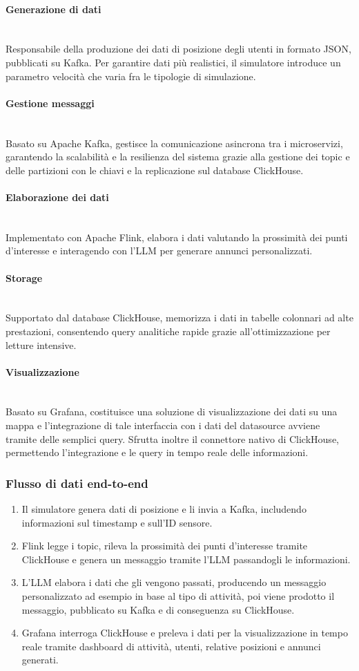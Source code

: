 \documentclass[10pt]{article}
\newcommand{\myparagraph}[1]{\paragraph{#1}\mbox{}\\}
\begin{document}
\myparagraph{Generazione di dati}
Responsabile della produzione dei dati di posizione degli utenti in formato JSON, pubblicati su Kafka.
Per garantire dati più realistici, il simulatore introduce un parametro velocità che varia fra le tipologie di simulazione.

\myparagraph{Gestione messaggi}
Basato su Apache Kafka, gestisce la comunicazione asincrona tra i microservizi, garantendo la scalabilità e la resilienza del sistema grazie alla gestione dei topic e delle partizioni con le chiavi e la replicazione sul database ClickHouse.

\myparagraph{Elaborazione dei dati}
Implementato con Apache Flink, elabora i dati valutando la prossimità dei punti d’interesse e interagendo con
l’LLM per generare annunci personalizzati.

\myparagraph{Storage}
Supportato dal database ClickHouse, memorizza i dati in tabelle colonnari ad alte prestazioni, consentendo query
analitiche rapide grazie all’ottimizzazione per letture intensive.

\myparagraph{Visualizzazione}
Basato su Grafana, costituisce una soluzione di visualizzazione dei dati su una mappa e l'integrazione di tale interfaccia con i dati del datasource avviene tramite delle semplici query.
Sfrutta inoltre il connettore nativo di ClickHouse, permettendo l'integrazione e le query in tempo reale delle informazioni.

\subsubsection{Flusso di dati end-to-end}
\begin{enumerate}
    \item Il simulatore genera dati di posizione e li invia a Kafka, includendo informazioni sul timestamp e sull’ID sensore.
    \item Flink legge i topic, rileva la prossimità dei punti d’interesse tramite ClickHouse e genera un messaggio tramite l'LLM passandogli le informazioni.
    \item L’LLM elabora i dati che gli vengono passati, producendo un messaggio personalizzato ad esempio in base al tipo di attività, poi viene prodotto il messaggio, pubblicato su Kafka e di conseguenza su ClickHouse.
    \item Grafana interroga ClickHouse e preleva i dati per la visualizzazione in tempo reale tramite dashboard di attività, utenti, relative posizioni e annunci generati.
\end{enumerate}
\end{document}
